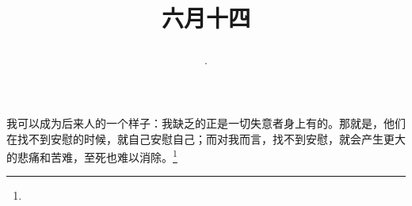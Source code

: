 \title{\date[d=19,m=7,y=2024][year:cn-y,年,month:cn,day:cn,日,·,weekday]·六月十四 }
我可以成为后来人的一个样子：我缺乏的正是一切失意者身上有的。那就是，他们在找不到安慰的时候，就自己安慰自己；而对我而言，找不到安慰，就会产生更大的悲痛和苦难，至死也难以消除。\footnote{ }

